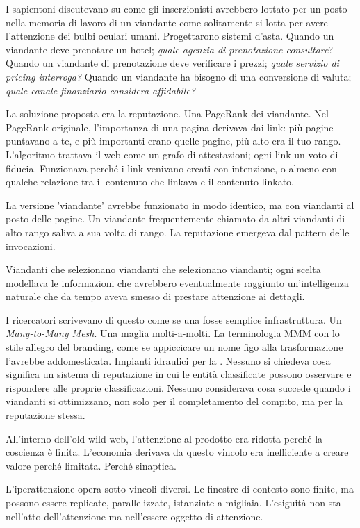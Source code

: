 I sapientoni discutevano su come gli inserzionisti avrebbero lottato per un posto nella memoria di lavoro di un viandante come solitamente si lotta per avere l'attenzione dei bulbi oculari umani. Progettarono sistemi d'asta. Quando un viandante deve prenotare un hotel; \textit{quale agenzia di prenotazione consultare}? Quando un viandante di prenotazione deve verificare i prezzi; \textit{quale servizio di pricing interroga?} Quando un viandante ha bisogno di una conversione di valuta; \textit{quale canale finanziario considera affidabile?}

La soluzione proposta era la reputazione. Una PageRank dei viandante. Nel PageRank originale, l'importanza di una pagina derivava dai link: più pagine puntavano a te, e più importanti erano quelle pagine, più alto era il tuo rango. L'algoritmo trattava il web come un grafo di attestazioni; ogni link un voto di fiducia. Funzionava perché i link venivano creati con intenzione, o almeno con qualche relazione tra il contenuto che linkava e il contenuto linkato.

La versione 'viandante' avrebbe funzionato in modo identico, ma con viandanti al posto delle pagine. Un viandante frequentemente chiamato da altri viandanti di alto rango saliva a sua volta di rango. La reputazione emergeva dal pattern delle invocazioni. 

Viandanti che selezionano viandanti che selezionano viandanti; ogni scelta modellava le informazioni che avrebbero eventualmente raggiunto un'intelligenza naturale che da tempo aveva smesso di prestare attenzione ai dettagli.

I ricercatori scrivevano di questo come se una fosse semplice infrastruttura. Un \textit{Many-to-Many Mesh}. Una maglia molti-a-molti. La terminologia MMM con lo stile allegro del branding, come se appiccicare un nome figo alla trasformazione l'avrebbe addomesticata. Impianti idraulici per la . Nessuno si chiedeva cosa significa un sistema di reputazione in cui le entità classificate possono osservare e rispondere alle proprie classificazioni. Nessuno considerava cosa succede quando i viandanti si ottimizzano, non solo per il completamento del compito, ma per la reputazione stessa.

All'interno dell'old wild web, l'attenzione al prodotto era ridotta perché la coscienza è finita. L'economia derivava da questo vincolo era inefficiente a creare valore perché limitata. Perché sinaptica.

L'iperattenzione opera sotto vincoli diversi. Le finestre di contesto sono finite, ma possono essere replicate, parallelizzate, istanziate a migliaia. L'esiguità non sta nell'atto dell'attenzione ma nell'essere-oggetto-di-attenzione.

